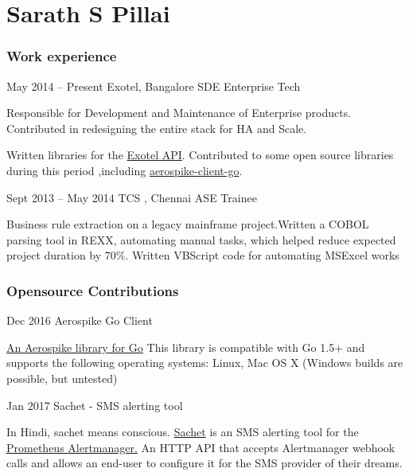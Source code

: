 \documentclass{tccv}
\begin{document}
\part{Sarath S Pillai}

\section{Work experience}

\begin{eventlist}

\item{May 2014 -- Present}
     {Exotel, Bangalore}
     {SDE Enterprise Tech}
     
Responsible for Development and Maintenance of Enterprise products. 
Contributed in redesigning the entire stack for HA and Scale.

Written libraries for the \href{https://pypi.python.org/pypi/exotel}{Exotel API}.
Contributed to some open source libraries during this period ,including  \href{https://github.com/aerospike/aerospike-client-go}{aerospike-client-go}.


\item{Sept 2013 -- May 2014}
     {TCS , Chennai}
     {ASE Trainee}

Business rule extraction on a legacy mainframe project.Written a COBOL parsing tool in REXX, automating manual tasks, which helped reduce expected project duration by 70\%. Written VBScript 
code for automating MSExcel  works

\end{eventlist}


\section{Opensource Contributions}

\begin{eventlist}
\item{Dec 2016}{ }{Aerospike Go Client}
     
\href{https://github.com/aerospike/aerospike-client-go}{An Aerospike library for Go}
This library is compatible with Go 1.5+ and supports the following operating systems: Linux, Mac OS X (Windows builds are possible, but untested) 

\item{Jan 2017}{  } {Sachet - SMS alerting tool}
     
In Hindi, sachet means conscious.
\href{https://github.com/messagebird/sachet}{Sachet} is an SMS alerting tool for the
\href{https://github.com/prometheus/alertmanager}{Prometheus Alertmanager.}
An HTTP API that accepts Alertmanager webhook calls and allows an end-user to configure it for the SMS provider of their dreams.
\end{eventlist}
\end{document}
